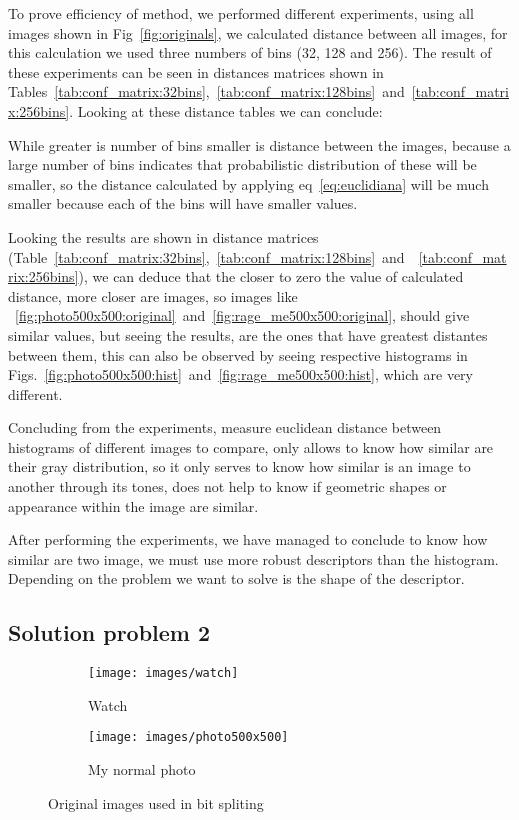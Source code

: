 \documentclass[journal]{IEEEtran}
\begin{document}
To prove efficiency of method, we performed different experiments, using all images shown in Fig~\ref{fig:originals}, we calculated distance between all images, for this calculation we used three numbers of bins (32, 128 and 256). The result of these experiments can be seen in distances matrices shown in Tables~\ref{tab:conf_matrix:32bins},~\ref{tab:conf_matrix:128bins}~and~\ref{tab:conf_matrix:256bins}. Looking at these distance tables we can conclude:
\begin{enumerate*}
	\item While greater is number of bins smaller is distance between the images, because a large number of bins indicates that probabilistic distribution of these will be smaller, so the distance calculated by applying eq~\ref{eq:euclidiana} will be much smaller because each of the bins will have smaller values.
	\item Looking the results are shown in distance matrices (Table~\ref{tab:conf_matrix:32bins},~\ref{tab:conf_matrix:128bins}~and~~\ref{tab:conf_matrix:256bins}), 
	we can deduce that the closer to zero the value of calculated distance, more closer are images, so images like ~\ref{fig:photo500x500:original}~and~\ref{fig:rage_me500x500:original}, should give similar values, but seeing the results, are the ones that have greatest distantes between them, this can also be observed by seeing respective histograms in Figs.~\ref{fig:photo500x500:hist}~and~\ref{fig:rage_me500x500:hist}, which are very different.
	\item Concluding from the experiments, measure euclidean distance between histograms of different images to compare, only allows to know how similar are their gray distribution, so it only serves to know how similar is an image to another through its tones,  does not help to know if geometric shapes or appearance within the image are similar.
\end{enumerate*}
 
After performing the experiments, we have managed to conclude to know how similar are two image, we must use more robust descriptors than the histogram. Depending on the problem we want to solve is the shape of the descriptor.

\subsection{Solution problem 2}


\begin{figure}[b]
	\centering
	\begin{subfigure}{0.18\textwidth}
		\centering
		\texttt{[image: images/watch]} 
		\caption{Watch}
		\label{fig:2:watch:original}
	\end{subfigure}
	\centering
	\begin{subfigure}{0.18\textwidth}
		\centering
		\texttt{[image: images/photo500x500]}
		\caption{My normal photo}
		\label{fig:2:photo500x500:original}
	\end{subfigure}
	
	\caption{Original images used in bit spliting}
	\label{fig:2:originals}
\end{figure}
\end{document}
